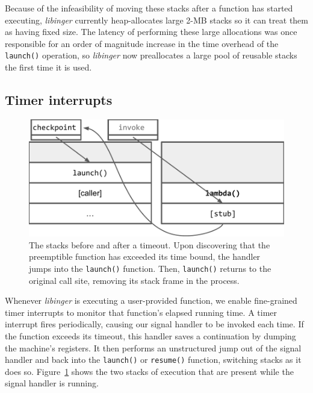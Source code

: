 Because of the infeasibility of moving these stacks after a function has started
executing, \textit{libinger} currently heap-allocates large 2-MB stacks so it can
treat them as having fixed size.  The latency of performing these large allocations
was once responsible for an order of magnitude increase in the time overhead of the
\texttt{launch()} operation, so \textit{libinger} now preallocates a large pool of
reusable stacks the first time it is used.


\subsection{Timer interrupts}

\begin{figure}
\includegraphics[width=\columnwidth]{figs/twostacks}
\caption{The stacks before and after a timeout.  \textnormal{Upon discovering
that the preemptible function has exceeded its time bound, the handler jumps into the
\texttt{launch()} function.  Then, \texttt{launch()} returns to the original call
site, removing its stack frame in the process.}}
\label{fig:twostacks}
\end{figure}

Whenever \textit{libinger} is executing a user-provided function, we
enable fine-grained timer interrupts to
monitor that function's elapsed running time.  A timer interrupt fires
periodically, causing our signal
handler to be invoked each time.  If the function exceeds its timeout,
this handler saves a continuation by dumping the machine's registers.  It then
performs an unstructured jump out of the signal handler and back into the
\texttt{launch()} or \texttt{resume()} function, switching stacks as it does so.
Figure~\ref{fig:twostacks} shows the two stacks of execution
that are present while the
signal handler is running.


